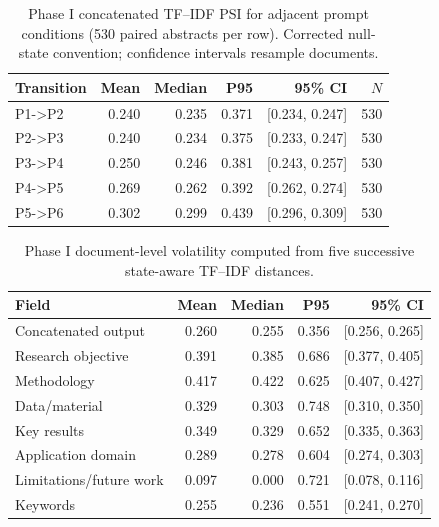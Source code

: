 \begin{table}[t]
\centering
\small
\caption{Phase I concatenated TF--IDF PSI for adjacent prompt conditions (530 paired abstracts per row). Corrected null-state convention; confidence intervals resample documents.}
\label{tab:pilot-domain}
\begin{tabular}{lrrrrr}
\toprule
Transition & Mean & Median & P95 & 95\% CI & $N$ \\
\midrule
P1->P2 & 0.240 & 0.235 & 0.371 & [0.234, 0.247] & 530 \\
P2->P3 & 0.240 & 0.234 & 0.375 & [0.233, 0.247] & 530 \\
P3->P4 & 0.250 & 0.246 & 0.381 & [0.243, 0.257] & 530 \\
P4->P5 & 0.269 & 0.262 & 0.392 & [0.262, 0.274] & 530 \\
P5->P6 & 0.302 & 0.299 & 0.439 & [0.296, 0.309] & 530 \\
\bottomrule
\end{tabular}
\end{table}

\begin{table}[t]
\centering
\small
\caption{Phase I document-level volatility computed from five successive state-aware TF--IDF distances.}
\label{tab:phase1-revised-vol}
\begin{tabular}{lrrrr}
\toprule
Field & Mean & Median & P95 & 95\% CI \\
\midrule
Concatenated output & 0.260 & 0.255 & 0.356 & [0.256, 0.265] \\
Research objective & 0.391 & 0.385 & 0.686 & [0.377, 0.405] \\
Methodology & 0.417 & 0.422 & 0.625 & [0.407, 0.427] \\
Data/material & 0.329 & 0.303 & 0.748 & [0.310, 0.350] \\
Key results & 0.349 & 0.329 & 0.652 & [0.335, 0.363] \\
Application domain & 0.289 & 0.278 & 0.604 & [0.274, 0.303] \\
Limitations/future work & 0.097 & 0.000 & 0.721 & [0.078, 0.116] \\
Keywords & 0.255 & 0.236 & 0.551 & [0.241, 0.270] \\
\bottomrule
\end{tabular}
\end{table}

